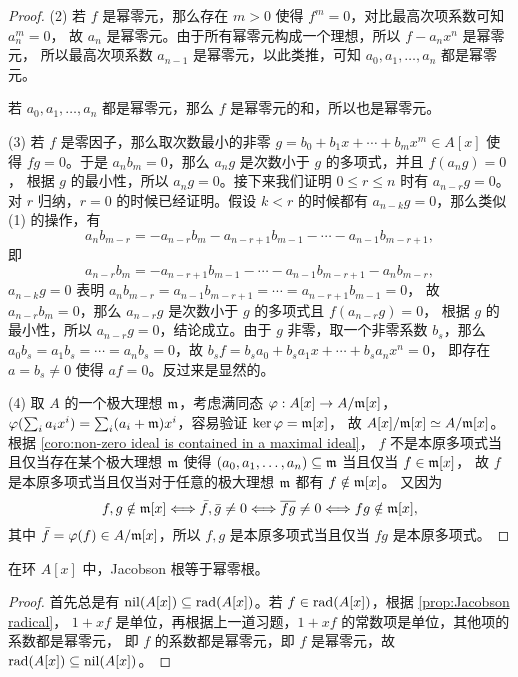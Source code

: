 \begin{proof}
  (2) 若 $f$ 是幂零元，那么存在 $m> 0$ 使得 $f^m=0$，对比最高次项系数可知 $a_n^m=0$，
  故 $a_n$ 是幂零元。由于所有幂零元构成一个理想，所以 $f-a_nx^n$ 是幂零元，
  所以最高次项系数 $a_{n-1}$ 是幂零元，以此类推，可知 $a_0,a_1,\dots,a_n$
  都是幂零元。

  若 $a_0,a_1,\dots,a_n$ 都是幂零元，那么 $f$ 是幂零元的和，所以也是幂零元。

  (3) 若 $f$ 是零因子，那么取次数最小的非零 $g=b_0+b_1x+\cdots+b_mx^m\in A[x]$ 使得
  $fg=0$。于是 $a_nb_m=0$，那么 $a_ng$ 是次数小于 $g$ 的多项式，并且 $f(a_ng)=0$，
  根据 $g$ 的最小性，所以 $a_ng=0$。接下来我们证明 $0\leq r\leq n$ 时有
  $a_{n-r}g=0$。对 $r$ 归纳，$r=0$ 的时候已经证明。假设 $k<r$ 的时候都有
  $a_{n-k}g=0$，那么类似 (1) 的操作，有
  \[
    a_nb_{m-r}=-a_{n-r}b_m-a_{n-r+1}b_{m-1}-\cdots-a_{n-1}b_{m-r+1},
  \]
  即
  \[
    a_{n-r}b_m=-a_{n-r+1}b_{m-1}-\cdots-a_{n-1}b_{m-r+1}-a_nb_{m-r},
  \]
  $a_{n-k}g=0$ 表明 $a_{n}b_{m-r}=a_{n-1}b_{m-r+1}=\cdots=a_{n-r+1}b_{m-1}=0$，
  故 $a_{n-r}b_m=0$，那么 $a_{n-r}g$ 是次数小于 $g$ 的多项式且 $f(a_{n-r}g)=0$，
  根据 $g$ 的最小性，所以 $a_{n-r}g=0$，结论成立。由于 $g$ 非零，取一个非零系数
  $b_s$，那么 $a_0b_s=a_1b_s=\cdots=a_nb_s=0$，故 $b_sf=b_sa_0+b_sa_1x+\cdots+b_sa_nx^n=0$，
  即存在 $a=b_s\neq 0$ 使得 $af=0$。反过来是显然的。

  (4) 取 $A$ 的一个极大理想 $\mathfrak{m}$，考虑满同态 $\varphi:A[x]\to A/\mathfrak{m}[x]$，
  $\varphi(\sum_i a_ix^i)=\sum_i(a_i+\mathfrak{m})x^i$，容易验证 $\ker\varphi=\mathfrak{m}[x]$，
  故 $A[x]/\mathfrak{m}[x]\simeq A/\mathfrak{m}[x]$。
  根据 \autoref{coro:non-zero ideal is contained in a maximal ideal}，
  $f$ 不是本原多项式当且仅当存在某个极大理想 $\mathfrak{m}$ 
  使得 $(a_0,a_1,\dots,a_n)\subseteq \mathfrak{m}$ 当且仅当 $f\in\mathfrak{m}[x]$，
  故 $f$ 是本原多项式当且仅当对于任意的极大理想 $\mathfrak{m}$ 都有 $f\notin\mathfrak{m}[x]$。
  又因为
  \[
    f,g\notin\mathfrak{m}[x]\Longleftrightarrow
    \bar{f},\bar{g}\neq 0\Longleftrightarrow
    \overline{fg}\neq 0\Longleftrightarrow
    fg\notin\mathfrak{m}[x],  
  \]
  其中 $\bar f=\varphi(f)\in A/\mathfrak{m}[x]$，所以 $f,g$ 是本原多项式当且仅当 $fg$ 是本原多项式。
\end{proof}

\begin{problem}
  在环 $A[x]$ 中，Jacobson 根等于幂零根。
\end{problem}
\begin{proof}
  首先总是有 $\operatorname{nil}(A[x])\subseteq \operatorname{rad}(A[x])$。若
  $f\in \operatorname{rad}(A[x])$，根据 \autoref{prop:Jacobson radical}，
  $1+xf$ 是单位，再根据上一道习题，$1+xf$ 的常数项是单位，其他项的系数都是幂零元，
  即 $f$ 的系数都是幂零元，即 $f$ 是幂零元，故 $\operatorname{rad}(A[x])\subseteq \operatorname{nil}(A[x])$。
\end{proof}

